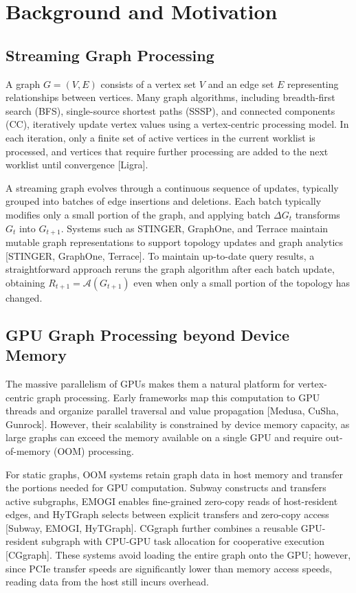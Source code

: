 \section{Background and Motivation}

\subsection{Streaming Graph Processing}

A graph $G=(V,E)$ consists of a vertex set $V$ and an edge set $E$ representing relationships between vertices. Many graph algorithms, including breadth-first search (BFS), single-source shortest paths (SSSP), and connected components (CC), iteratively update vertex values using a vertex-centric processing model. In each iteration, only a finite set of active vertices in the current worklist is processed, and vertices that require further processing are added to the next worklist until convergence [Ligra].

A streaming graph evolves through a continuous sequence of updates, typically grouped into batches of edge insertions and deletions. Each batch typically modifies only a small portion of the graph, and applying batch $\Delta G_t$ transforms $G_t$ into $G_{t+1}$. Systems such as STINGER, GraphOne, and Terrace maintain mutable graph representations to support topology updates and graph analytics [STINGER, GraphOne, Terrace]. To maintain up-to-date query results, a straightforward approach reruns the graph algorithm after each batch update, obtaining $R_{t+1}=\mathcal{A}(G_{t+1})$ even when only a small portion of the topology has changed.

\subsection{GPU Graph Processing beyond Device Memory}

The massive parallelism of GPUs makes them a natural platform for vertex-centric graph processing. Early frameworks map this computation to GPU threads and organize parallel traversal and value propagation [Medusa, CuSha, Gunrock]. However, their scalability is constrained by device memory capacity, as large graphs can exceed the memory available on a single GPU and require out-of-memory (OOM) processing.

For static graphs, OOM systems retain graph data in host memory and transfer the portions needed for GPU computation. Subway constructs and transfers active subgraphs, EMOGI enables fine-grained zero-copy reads of host-resident edges, and HyTGraph selects between explicit transfers and zero-copy access [Subway, EMOGI, HyTGraph]. CGgraph further combines a reusable GPU-resident subgraph with CPU-GPU task allocation for cooperative execution [CGgraph]. These systems avoid loading the entire graph onto the GPU; however, since PCIe transfer speeds are significantly lower than memory access speeds, reading data from the host still incurs overhead.

